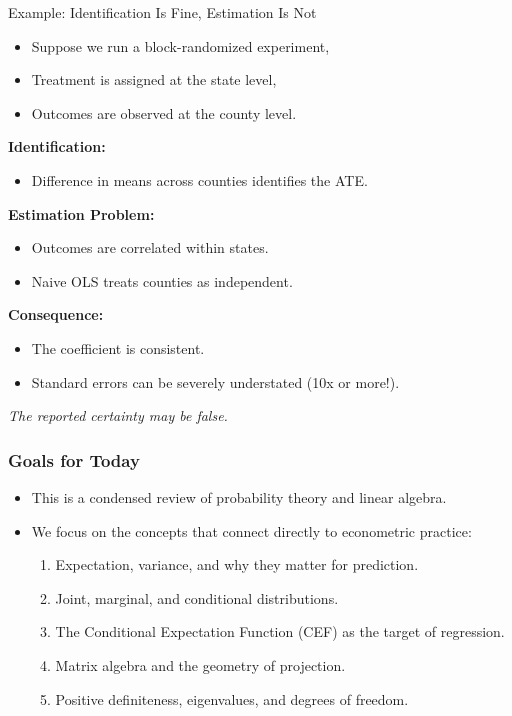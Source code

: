 \documentclass[aspectratio=169, handout, t]{beamer}
\numberwithin{equation}{section}
\begin{document}
\begin{frame}{Example: Identification Is Fine, Estimation Is Not}

\begin{itemize}
 \item Suppose we run a block-randomized experiment,
 \item Treatment is assigned at the state level,
 \item Outcomes are observed at the county level.
\end{itemize}

\vspace{0.2cm}

\textbf{Identification:}
\begin{itemize}
    \item Difference in means across counties identifies the ATE.
\end{itemize}

\vspace{0.2cm}

\textbf{Estimation Problem:}
\begin{itemize}
    \item Outcomes are correlated within states.
    \item Naive OLS treats counties as independent.
\end{itemize}

\vspace{0.2cm}

\textbf{Consequence:}
\begin{itemize}
    \item The coefficient is consistent.
    \item Standard errors can be severely understated (10x or more!).
\end{itemize}

\vspace{0.1cm}

\begin{center}
\emph{The reported certainty may be false.}
\end{center}

\end{frame}


\begin{frame}
\frametitle{Goals for Today}
\begin{itemize}
\item This is a condensed review of probability theory and linear algebra.
\item We focus on the concepts that connect directly to econometric practice:
\begin{enumerate}
\item Expectation, variance, and why they matter for prediction.
\item Joint, marginal, and conditional distributions.
\item The Conditional Expectation Function (CEF) as the target of regression.
\item Matrix algebra and the geometry of projection.
\item Positive definiteness, eigenvalues, and degrees of freedom.
\end{enumerate}
\end{itemize}
\end{frame}
\end{document}
